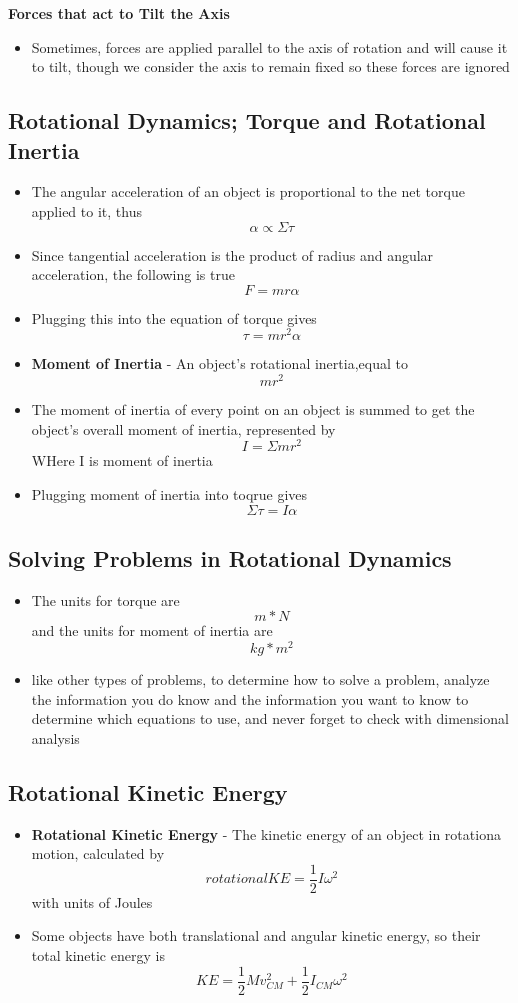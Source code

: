 \textbf{Forces that act to Tilt the Axis}
\begin{itemize}
    \item Sometimes, forces are applied parallel to the axis of rotation and will cause it to tilt, though we consider the axis to remain fixed so these forces are ignored
\end{itemize}

\subsection{Rotational Dynamics; Torque and Rotational Inertia}
\begin{itemize}
    \item The angular acceleration of an object is proportional to the net torque applied to it, thus \[\alpha\propto\Sigma\tau\]
    \item Since tangential acceleration is the product of radius and angular acceleration, the following is true \[F=mr\alpha\]
    \item Plugging this into the equation of torque gives \[\tau=mr^2\alpha\]
    \item \textbf{Moment of Inertia} - An object's rotational inertia,equal to \[mr^2\]
    \item The moment of inertia of every point on an object is summed to get the object's overall moment of inertia, represented by \[I=\Sigma mr^2\] WHere I is moment of inertia
    \item Plugging moment of inertia into toqrue gives \[\Sigma\tau=I\alpha\]
\end{itemize}

\subsection{Solving Problems in Rotational Dynamics}
\begin{itemize}
    \item The units for torque are \[m*N\] and the units for moment of inertia are \[kg*m^2\]
    \item like other types of problems, to determine how to solve a problem, analyze the information you do know and the information you want to know to determine which equations to use, and never forget to check with dimensional analysis
\end{itemize}

\subsection{Rotational Kinetic Energy}
\begin{itemize}
    \item \textbf{Rotational Kinetic Energy} - The kinetic energy of an object in rotationa motion, calculated by \[rotational KE=\frac{1}{2}I\omega^2\] with units of Joules
    \item Some objects have both translational and angular kinetic energy, so their total kinetic energy is \[KE=\frac{1}{2}Mv^2_{CM}+\frac{1}{2}I_{CM}\omega^2\]
\end{itemize}

